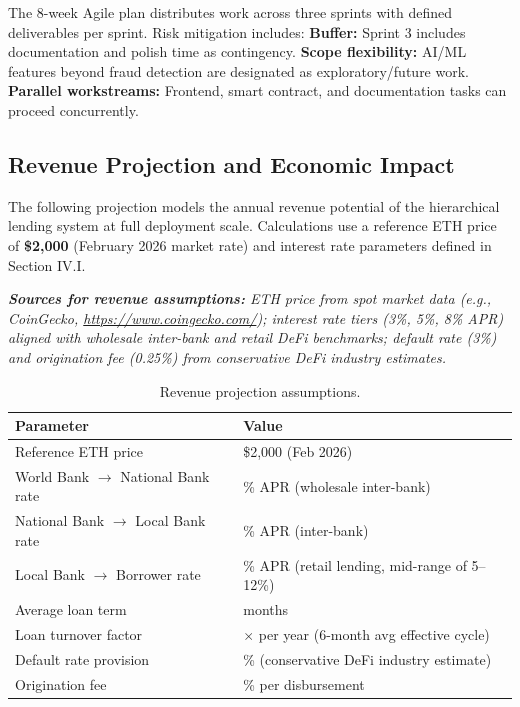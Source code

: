\documentclass[11pt,a4paper]{article}
\newcommand{\tableheadfont}{\bfseries\small\color{PrimaryBlue}}
\newenvironment{moderntable}[1][H]{%
    \begin{table}[#1]\centering\small%
    \renewcommand{\arraystretch}{1.35}%
}{%
    \end{table}%
}
\begin{document}
The 8-week Agile plan distributes work across three sprints with defined deliverables per sprint. Risk mitigation includes: \textbf{Buffer:} Sprint 3 includes documentation and polish time as contingency. \textbf{Scope flexibility:} AI/ML features beyond fraud detection are designated as exploratory/future work. \textbf{Parallel workstreams:} Frontend, smart contract, and documentation tasks can proceed concurrently.

\subsection{Revenue Projection and Economic Impact}

The following projection models the annual revenue potential of the hierarchical lending system at full deployment scale. Calculations use a reference ETH price of \textbf{\$2,000} (February 2026 market rate) and interest rate parameters defined in Section IV.I.

\vspace{4pt}
\noindent\textit{\small\textbf{Sources for revenue assumptions:} ETH price from spot market data (e.g., CoinGecko, \url{https://www.coingecko.com/}); interest rate tiers (3\%, 5\%, 8\% APR) aligned with wholesale inter-bank and retail DeFi benchmarks; default rate (3\%) and origination fee (0.25\%) from conservative DeFi industry estimates.}

\begin{moderntable}
\caption{Revenue projection assumptions.}
\begin{tabular}{@{} >{\raggedright}p{5.5cm} >{\raggedright\arraybackslash}p{6.5cm} @{}}
\toprule
\tableheadfont Parameter & \tableheadfont Value \\
\midrule
\rowcolor{RowShade}
Reference ETH price & \$2,000 (Feb 2026) \\
World Bank $\to$ National Bank rate & 3\% APR (wholesale inter-bank) \\
\rowcolor{RowShade}
National Bank $\to$ Local Bank rate & 5\% APR (inter-bank) \\
Local Bank $\to$ Borrower rate & 8\% APR (retail lending, mid-range of 5--12\%) \\
\rowcolor{RowShade}
Average loan term & 12 months \\
Loan turnover factor & 2$\times$ per year (6-month avg effective cycle) \\
\rowcolor{RowShade}
Default rate provision & 3\% (conservative DeFi industry estimate) \\
Origination fee & 0.25\% per disbursement \\
\bottomrule
\end{tabular}
\end{moderntable}
\end{document}
